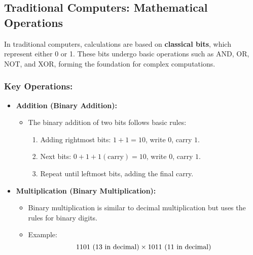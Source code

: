 \documentclass[conference]{IEEEtran}
\begin{document}
\subsection{Traditional Computers: Mathematical Operations}

In traditional computers, calculations are based on \textbf{classical bits}, which represent either 0 or 1. These bits undergo basic operations such as AND, OR, NOT, and XOR, forming the foundation for complex computations.

\subsubsection{Key Operations:}

\begin{itemize}
    \item \textbf{Addition (Binary Addition):}
    \begin{itemize}
        \item The binary addition of two bits follows basic rules:
        \begin{enumerate}[noitemsep]
    \item Adding rightmost bits: \(1 + 1 = 10\), write \(0\), carry \(1\).
    \item Next bits: \(0 + 1 + 1 (\text{carry}) = 10\), write \(0\), carry \(1\).
    \\
    \item Repeat until leftmost bits, adding the final carry.
\end{enumerate}
    \end{itemize}
    
    \item \textbf{Multiplication (Binary Multiplication):}
    \begin{itemize}
        \item Binary multiplication is similar to decimal multiplication but uses the rules for binary digits.
        \item Example:
        \[
        1101 \ (\text{13 in decimal}) \\
        \times 1011 \ (\text{11 in decimal}) \\
        
        \\
        \]
    \end{itemize}
    

\end{itemize}
\end{document}
